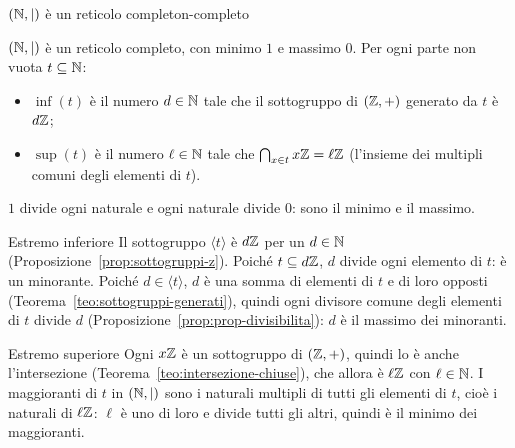 \begin{concetto}
\begin{Proposizione}{$(\mathbb{N}, \mid)$ è un reticolo completo}{n-completo}
    \begin{prerequisiti}
    \end{prerequisiti}
    $(\mathbb{N}, \mid)$ è un reticolo completo, con minimo $1$ e massimo $0$. Per ogni parte non vuota $t \subseteq \mathbb{N}$:
    \begin{itemize}
        \item $\inf(t)$ è il numero $d \in \mathbb{N}$ tale che il sottogruppo di $(\mathbb{Z}, +)$ generato da $t$ è $d\mathbb{Z}$;
        \item $\sup(t)$ è il numero $\ell \in \mathbb{N}$ tale che $\bigcap_{x \in t} x\mathbb{Z} = \ell\mathbb{Z}$ (l'insieme dei multipli comuni degli elementi di $t$).
    \end{itemize}
\end{Proposizione}
\begin{dimostrazione}
    \facoltativa
    $1$ divide ogni naturale e ogni naturale divide $0$: sono il minimo e il massimo.
    \begin{caso}{Estremo inferiore}
        Il sottogruppo $\langle t \rangle$ è $d\mathbb{Z}$ per un $d \in \mathbb{N}$ (Proposizione~\ref{prop:sottogruppi-z}). Poiché $t \subseteq d\mathbb{Z}$, $d$ divide ogni elemento di $t$: è un
        minorante. Poiché $d \in \langle t \rangle$, $d$ è una somma di elementi di $t$ e di loro opposti (Teorema~\ref{teo:sottogruppi-generati}), quindi ogni divisore
        comune degli elementi di $t$ divide $d$ (Proposizione~\ref{prop:prop-divisibilita}): $d$ è il massimo dei minoranti.
    \end{caso}
    \begin{caso}{Estremo superiore}
        Ogni $x\mathbb{Z}$ è un sottogruppo di $(\mathbb{Z}, +)$, quindi lo è anche l'intersezione (Teorema~\ref{teo:intersezione-chiuse}), che allora è $\ell\mathbb{Z}$ con
        $\ell \in \mathbb{N}$. I maggioranti di $t$ in $(\mathbb{N}, \mid)$ sono i naturali multipli di tutti gli elementi di $t$, cioè i naturali di $\ell\mathbb{Z}$: $\ell$ è uno di
        loro e divide tutti gli altri, quindi è il minimo dei maggioranti.
    \end{caso}
\end{dimostrazione}
\end{concetto}

